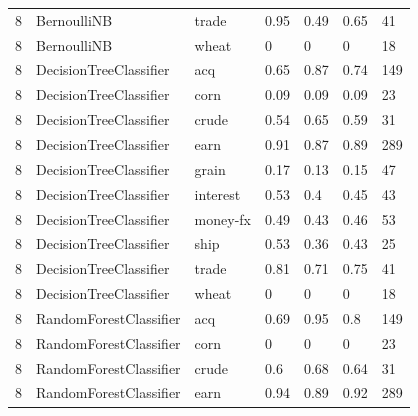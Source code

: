 \documentclass{article}
\begin{document}
\begin{table}[h]
\begin{tabular}{lllllll}
8             & BernoulliNB            & trade           & 0.95               & 0.49            & 0.65              & 41               \\
8             & BernoulliNB            & wheat           & 0                  & 0               & 0                 & 18               \\
8             & DecisionTreeClassifier & acq             & 0.65               & 0.87            & 0.74              & 149              \\
8             & DecisionTreeClassifier & corn            & 0.09               & 0.09            & 0.09              & 23               \\
8             & DecisionTreeClassifier & crude           & 0.54               & 0.65            & 0.59              & 31               \\
8             & DecisionTreeClassifier & earn            & 0.91               & 0.87            & 0.89              & 289              \\
8             & DecisionTreeClassifier & grain           & 0.17               & 0.13            & 0.15              & 47               \\
8             & DecisionTreeClassifier & interest        & 0.53               & 0.4             & 0.45              & 43               \\
8             & DecisionTreeClassifier & money-fx        & 0.49               & 0.43            & 0.46              & 53               \\
8             & DecisionTreeClassifier & ship            & 0.53               & 0.36            & 0.43              & 25               \\
8             & DecisionTreeClassifier & trade           & 0.81               & 0.71            & 0.75              & 41               \\
8             & DecisionTreeClassifier & wheat           & 0                  & 0               & 0                 & 18               \\
8             & RandomForestClassifier & acq             & 0.69               & 0.95            & 0.8               & 149              \\
8             & RandomForestClassifier & corn            & 0                  & 0               & 0                 & 23               \\
8             & RandomForestClassifier & crude           & 0.6                & 0.68            & 0.64              & 31               \\
8             & RandomForestClassifier & earn            & 0.94               & 0.89            & 0.92              & 289              \\\end{tabular}
\end{table}
\end{document}
